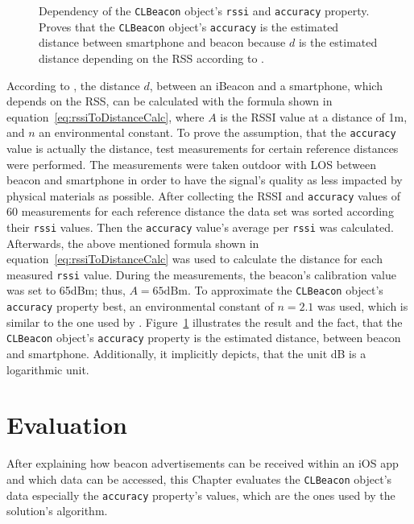\begin{figure}
  
	\caption{Dependency of the \texttt{CLBeacon} object's \texttt{rssi} and \texttt{accuracy} property. Proves that the \texttt{CLBeacon} object's \texttt{accuracy} is the estimated distance between smartphone and beacon because $d$ is the estimated distance depending on the \ac{RSS} according to \citet{wang:bt_pos,kotanen:exp_local_pos_bt}.}
	\label{fig:eval_accuracy_vs_distance}
\end{figure}

According to \citet{wang:bt_pos}, the distance $d$, between an iBeacon and a smartphone, which depends on the \acl{RSS}, can be calculated with the formula shown in equation~\ref{eq:rssiToDistanceCalc}, where $A$ is the \acs{RSSI} value at a distance of 1m, and $n$ an environmental constant. To prove the assumption, that the \texttt{accuracy} value is actually the distance, test measurements for certain reference distances were performed. The measurements were taken outdoor with \ac{LOS} between beacon and smartphone in order to have the signal's quality as less impacted by physical materials as possible. After collecting the \acs{RSSI} and \texttt{accuracy} values of 60 measurements for each reference distance the data set was sorted according their \texttt{rssi} values. Then the \texttt{accuracy} value's average per \texttt{rssi} was calculated. Afterwards, the above mentioned formula shown in equation~\ref{eq:rssiToDistanceCalc} was used to calculate the distance for each measured \texttt{rssi} value. During the measurements, the beacon's calibration value was set to 65dBm; thus, $A = 65\text{dBm}$. To approximate the \texttt{CLBeacon} object's \texttt{accuracy} property best, an environmental constant of $n = 2.1$ was used, which is similar to the one used by \citet{wang:bt_pos}.
Figure~\ref{fig:eval_accuracy_vs_distance} illustrates the result and the fact, that the \texttt{CLBeacon} object's \texttt{accuracy} property is the estimated distance, between beacon and smartphone. Additionally, it implicitly depicts, that the unit dB is a logarithmic unit.


\section{Evaluation}\label{sec:beacon_eval}
After explaining how beacon advertisements can be received within an iOS app and which data can be accessed, this Chapter evaluates the \texttt{CLBeacon} object's data especially the \texttt{accuracy} property's values, which are the ones used by the solution's algorithm.


